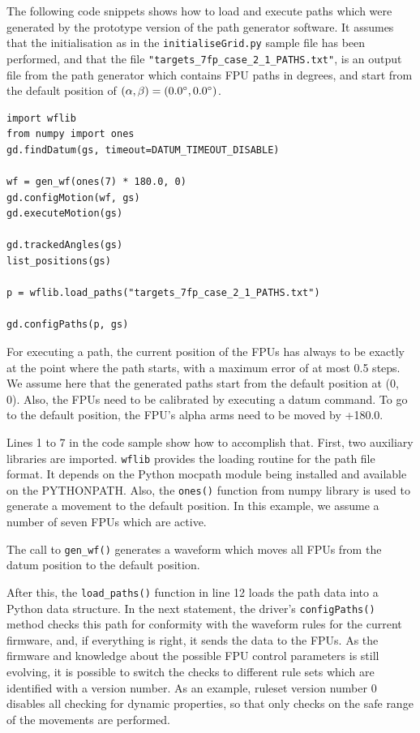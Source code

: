 \documentclass[11pt,a4paper]{scrartcl}
\begin{document}
The following code snippets shows how to load and execute paths which
were generated by the prototype version of the path generator
software. It assumes that the initialisation as in the
\texttt{initialiseGrid.py} sample file has been performed, and that
the file \texttt{"targets\_7fp\_case\_2\_1\_PATHS.txt"}, is an output file
from the path generator which contains FPU paths in degrees, and start
from the default position of $(\alpha,\beta) = (0.0\degree, 0.0\degree)$.

\begin{verbatim}
import wflib
from numpy import ones
gd.findDatum(gs, timeout=DATUM_TIMEOUT_DISABLE)

wf = gen_wf(ones(7) * 180.0, 0)
gd.configMotion(wf, gs)
gd.executeMotion(gs)

gd.trackedAngles(gs)
list_positions(gs)

p = wflib.load_paths("targets_7fp_case_2_1_PATHS.txt")

gd.configPaths(p, gs)
\end{verbatim}

For executing a path, the current position of the FPUs has always to
be exactly at the point where the path starts, with a maximum error of
at most 0.5 steps. We assume here that the generated paths start from
the default position at (0\degree, 0\degree). Also, the FPUs need to
be calibrated by executing a datum command. To go to the default position,
the FPU's alpha arms need to be moved by +180.0\degree.

Lines 1 to 7 in the code sample show how to accomplish that.  First,
two auxiliary libraries are imported. \texttt{wflib} provides the
loading routine for the path file format. It depends on the Python
mocpath module being installed and available on the PYTHONPATH.  Also,
the \texttt{ones()} function from numpy library is used to generate a
movement to the default position. In this example, we assume a number
of seven FPUs which are active.

The call to \texttt{gen\_wf()} generates a waveform which moves all
FPUs from the datum position to the default position.

After this, the \texttt{load\_paths()} function in line 12 loads the
path data into a Python data structure. In the next statement, the
driver's \texttt{configPaths()} method checks this path for conformity
with the waveform rules for the current firmware, and, if everything
is right, it sends the data to the FPUs. As the firmware and knowledge
about the possible FPU control parameters is still evolving, it is
possible to switch the checks to different rule sets which are
identified with a version number. As an example, ruleset version
number 0 disables all checking for dynamic properties, so that only
checks on the safe range of the movements are performed.
\end{document}
